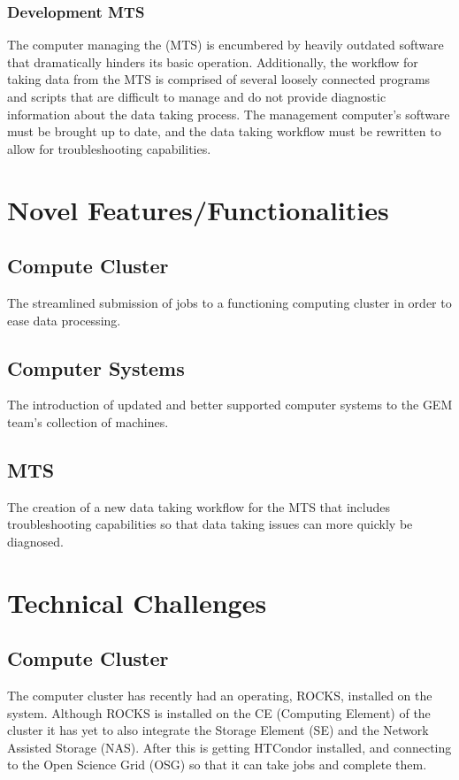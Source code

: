 \documentclass[12pt]{article}
\newcommand\tab[1][1cm]{\hspace*{#1}}
\begin{document}
		\subsubsection{Development MTS}
\tab The computer managing the (MTS) is encumbered by heavily outdated software that dramatically hinders its basic operation. Additionally, the workflow for taking data from the MTS is
comprised of several loosely connected programs and scripts that
are difficult to manage and do not provide diagnostic information
about the data taking process. The management computer’s software must be brought up to date, and the data taking workflow must be rewritten to allow for troubleshooting capabilities.


\section{Novel Features/Functionalities}
\subsection{Compute Cluster}
\tab The streamlined submission of jobs to a functioning computing
cluster in order to ease data processing.
\subsection{Computer Systems}
\tab The introduction of updated and better supported computer systems to the GEM team’s
collection of machines.
\subsection{MTS}
The creation of a new data taking workflow for the MTS that
includes troubleshooting capabilities so that data taking issues can
more quickly be diagnosed.



\section{Technical Challenges}
\subsection{Compute Cluster}
\tab The computer cluster has recently had an operating, ROCKS, installed on the system. Although ROCKS is installed on the CE (Computing Element) of the cluster it has yet to also integrate the Storage Element (SE) and the Network Assisted Storage (NAS). After this is getting HTCondor installed, and connecting to the Open Science Grid (OSG) so that it can take jobs and complete them. 
\end{document}
